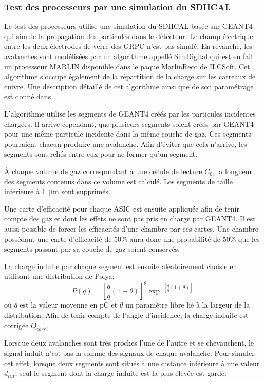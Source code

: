 \subsubsection{Test des processeurs par une simulation du SDHCAL}
Le test des processeurs utilise une simulation du SDHCAL basée sur GEANT4\cite{AGOSTINELLI2003250} qui simule la propagation des particules dans le détecteur. Le champ électrique entre les deux électrodes de verre des GRPC n'est pas simulé. En revanche, les avalanches sont modélisées par un algorithme appellé SimDigital qui est en fait un processeur MARLIN disponible dans le paque MarlinReco \cite{2007Prama} de ILCSoft. Cet algorithme s'occupe également de la répartition de la charge sur les carreaux de cuivre. Une description détaillé de cet algorithme ainsi que de son paramétrage est donné dans \cite{steen:tel-01282680}.

L'algorithme utilise les segments de GEANT4 créés par les particules incidentes chargées. Il arrive cependant, que plusieurs segments soient créés par GEANT4 pour une même particule incidente dans la même couche de gaz. Ces segments pourraient chacun produire une avalanche. Afin d'éviter que cela n'arrive, les segments sont reliés entre eux pour ne former qu'un segment.

 À chaque volume de gaz correspondant à une cellule de lecture $C_{0}$, la longueur des segments contenus dans ce volume est calculé. Les segments de taille inférieure à \SI{1}{\micro\meter} sont supprimés.
 
 Une carte d'efficacité pour chaque ASIC est ensuite appliquée afin de tenir compte des gaz  et  dont les effets ne sont pas pris en charge par GEANT4. Il est aussi possible de forcer les efficacités d'une chambre par ces cartes. Une chambre possédant une carte d'efficacité de 50\% aura donc une probabilité de 50\% que les segments passant par sa couche de gaz soient conservés.
 
 La charge induite par chaque segment est ensuite aléatoirement choisie en utilisant une distribution de Polya:
 \begin{equation}
 P(q)=\left[\frac{q}{\bar{q}}(1+\theta)\right]^\theta\exp^{-\left[\frac{q}{\bar{q}}(1+\theta)\right]}
 \end{equation}
 où $\bar{q}$ est la valeur moyenne en \si{\pico\coulomb} et $\theta$ un paramètre libre lié à la largeur de la distribution. Afin de tenir compte de l'angle d'incidence, la charge induite est corrigée $Q_{corr}$.
 
 Lorsque deux avalanches sont très proches l'une de l'autre et se chevauchent, le signal induit n'est pas la somme des signaux de chaque avalanche. Pour simuler cet effet, lorsque deux segments sont situés à une distance inférieure à une valeur $d_{cut}$, seul le segment dont la charge induite est la plus élevée est gardé.
 
